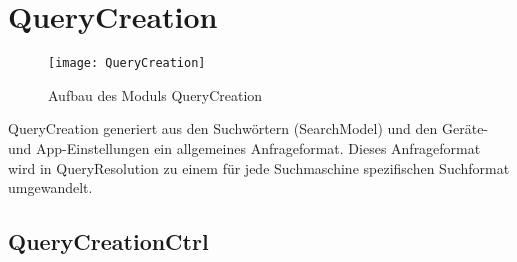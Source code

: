 
\section{QueryCreation}

\begin{figure}[htb]
   \centering
  	\texttt{[image: QueryCreation]}
  	\caption{Aufbau des Moduls QueryCreation}
	\label{fig:Aufbau des Moduls QueryCreation}
\end{figure}

QueryCreation generiert aus den Suchwörtern (SearchModel) und den Geräte- und App-Einstellungen ein allgemeines Anfrageformat. Dieses Anfrageformat wird in QueryResolution zu einem für jede Suchmaschine spezifischen Suchformat umgewandelt.

\subsection{QueryCreationCtrl}

